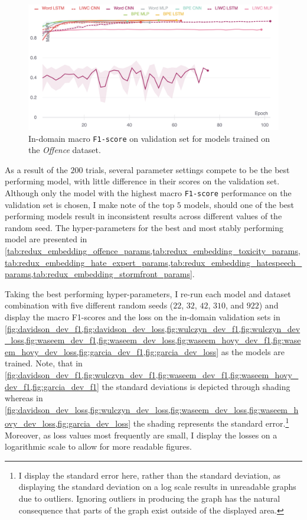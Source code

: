 \begin{figure}
    \centering
    \includegraphics[width=\textwidth]{davidson_dev_f1.pdf}
    \caption{In-domain macro \texttt{F1-score} on validation set for models trained on the \textit{Offence} dataset.}
    \label{fig:davidson_dev_f1}
\end{figure}
As a result of the $200$ trials, several parameter settings compete to be the best performing model, with little difference in their scores on the validation set. Although only the model with the highest macro \texttt{F1-score} performance on the validation set is chosen, I make note of the top $5$ models, should one of the best performing models result in inconsistent results across different values of the random seed. The hyper-parameters for the best and most stably performing model are presented in \cref{tab:redux_embedding_offence_params,tab:redux_embedding_toxicity_params,tab:redux_embedding_hate_expert_params,tab:redux_embedding_hatespeech_params,tab:redux_embedding_stormfront_params}.

Taking the best performing hyper-parameters, I re-run each model and dataset combination with five different random seeds ($22$, $32$, $42$, $310$, and $922$) and display the macro F1-scores and the loss on the in-domain validation sets in \cref{fig:davidson_dev_f1,fig:davidson_dev_loss,fig:wulczyn_dev_f1,fig:wulczyn_dev_loss,fig:waseem_dev_f1,fig:waseem_dev_loss,fig:waseem_hovy_dev_f1,fig:waseem_hovy_dev_loss,fig:garcia_dev_f1,fig:garcia_dev_loss} as the models are trained.
Note, that in \cref{fig:davidson_dev_f1,fig:wulczyn_dev_f1,fig:waseem_dev_f1,fig:waseem_hovy_dev_f1,fig:garcia_dev_f1} the standard deviations is depicted through shading whereas in \cref{fig:davidson_dev_loss,fig:wulczyn_dev_loss,fig:waseem_dev_loss,fig:waseem_hovy_dev_loss,fig:garcia_dev_loss} the shading represents the standard error.\footnote{I display the standard error here, rather than the standard deviation, as displaying the standard deviation on a log scale results in unreadable graphs due to outliers. Ignoring outliers in producing the graph has the natural consequence that parts of the graph exist outside of the displayed area.}
Moreover, as loss values most frequently are small, I display the losses on a  logarithmic scale to allow for more readable figures.\vspace{5mm}

